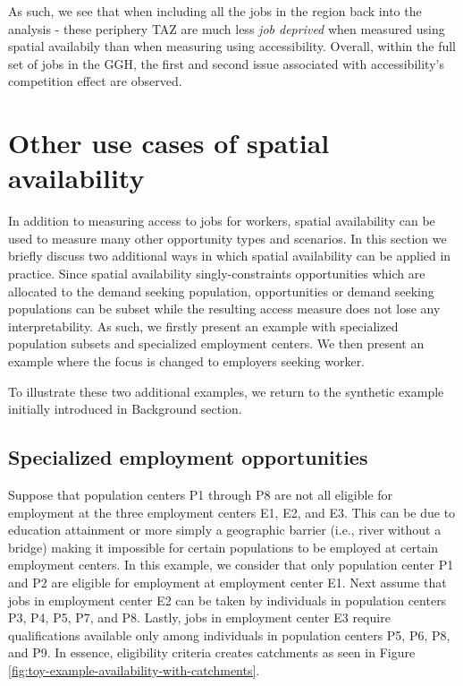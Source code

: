 \documentclass[]{elsarticle} %
\begin{document}
As such, we see that when including all the jobs in the region back into
the analysis - these periphery TAZ are much less \emph{job deprived}
when measured using spatial availabily than when measuring using
accessibility. Overall, within the full set of jobs in the GGH, the
first and second issue associated with accessibility's competition
effect are observed.

\hypertarget{other-use-cases-of-spatial-availability}{%
\section{Other use cases of spatial
availability}\label{other-use-cases-of-spatial-availability}}

In addition to measuring access to jobs for workers, spatial
availability can be used to measure many other opportunity types and
scenarios. In this section we briefly discuss two additional ways in
which spatial availability can be applied in practice. Since spatial
availability singly-constraints opportunities which are allocated to the
demand seeking population, opportunities or demand seeking populations
can be subset while the resulting access measure does not lose any
interpretability. As such, we firstly present an example with
specialized population subsets and specialized employment centers. We
then present an example where the focus is changed to employers seeking
worker.

To illustrate these two additional examples, we return to the synthetic
example initially introduced in Background section.

\hypertarget{specialized-employment-opportunities}{%
\subsection{Specialized employment
opportunities}\label{specialized-employment-opportunities}}

Suppose that population centers P1 through P8 are not all eligible for
employment at the three employment centers E1, E2, and E3. This can be
due to education attainment or more simply a geographic barrier (i.e.,
river without a bridge) making it impossible for certain populations to
be employed at certain employment centers. In this example, we consider
that only population center P1 and P2 are eligible for employment at
employment center E1. Next assume that jobs in employment center E2 can
be taken by individuals in population centers P3, P4, P5, P7, and P8.
Lastly, jobs in employment center E3 require qualifications available
only among individuals in population centers P5, P6, P8, and P9. In
essence, eligibility criteria creates catchments as seen in Figure
\ref{fig:toy-example-availability-with-catchments}.
\end{document}
